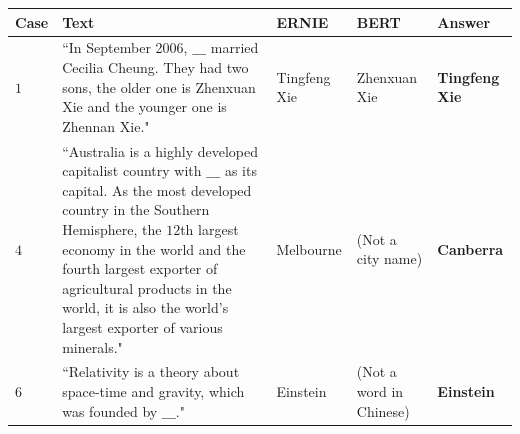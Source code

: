 \begin{table}[htbp]
    \centering 
    \linespread{0.5}
    \setlength{\tabcolsep}{4pt} %
    \renewcommand{\arraystretch}{3} %
    
    \begin{tableFont}
    \begin{tabu} to \textwidth {| X[0.4] | X[6] | X | X | X |}
        
    
        \hline
      
        \centering \textbf{Case}
        & \centering \textbf{Text} 
        & \centering \textbf{ERNIE}
        & \centering\textbf{BERT} 
        & \centering \textbf{Answer} \\ 
        
        \hline
        
        
        $1$
        &
        ``In September 2006, $\_\_\_$ married Cecilia Cheung. They had two sons, the older one is Zhenxuan Xie and the younger one is Zhennan Xie." \newline
        & 
        Tingfeng Xie
        & 
        Zhenxuan Xie
        & 
        {\color{Green} \textbf{Tingfeng Xie}} \\ 
        
        \hline 
        
        
        
        $4$
        &
        ``Australia is a highly developed capitalist country with $\_\_\_$ as its capital. As the most developed country in the Southern Hemisphere, the $12$th largest economy in the world and the fourth largest exporter of agricultural products in the world, it is also the world's largest exporter of various minerals."   \newline 
        & 
        Melbourne
        & 
        (Not a city name)
        & 
        {\color{Green} \textbf{Canberra}} \\ 
        
        \hline 
        
        $6$
        &
        ``Relativity is a theory about space-time and gravity, which was founded by $\_\_\_$."   
        & 
        Einstein
        & 
        (Not a word in Chinese)
        & 
        {\color{Green} \textbf{Einstein}} \\ 
        
        
        \hline 
    \end{tabu}
    
    \end{tableFont}
    
    \vspace{-5pt}
    
    
    \label{tbl:ernie_vs_bert_knowledgeLearningTask}
\end{table}

